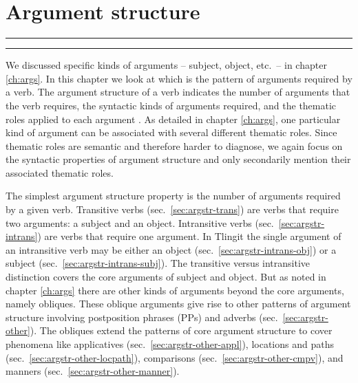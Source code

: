 
\resetexcnt
\chapter{Argument structure}\label{ch:argstr}

\startcontents[chapters]
\noindent\rule[0.5em]{\textwidth}{\heavyrulewidth}
\noindent\rule{\textwidth}{\heavyrulewidth}
\vspace{1\baselineskip}


We discussed specific kinds of arguments – subject, object, etc.\ – in chapter \ref{ch:args}.
In this chapter we look at  which is the pattern of arguments required by a verb.
The argument structure of a verb indicates the number of arguments that the verb requires, the syntactic kinds of arguments required, and the thematic roles applied to each argument \parencite{levin:2018}.
As detailed in chapter \ref{ch:args}, one particular kind of argument can be associated with several different thematic roles.
Since thematic roles are semantic and therefore harder to diagnose, we again focus on the syntactic properties of argument structure and only secondarily mention their associated thematic roles.

The simplest argument structure property is the number of arguments required by a given verb.
Transitive verbs (sec.\ \ref{sec:argstr-trans}) are verbs that require two arguments: a subject and an object.
Intransitive verbs (sec.\ \ref{sec:argstr-intrans}) are verbs that require one argument.
In Tlingit the single argument of an intransitive verb may be either an object (sec.\ \ref{sec:argstr-intrans-obj}) or a subject (sec.\ \ref{sec:argstr-intrans-subj}).
The transitive versus intransitive distinction covers the core arguments of subject and object.
But as noted in chapter \ref{ch:args} there are other kinds of arguments beyond the core arguments, namely obliques.
These oblique arguments give rise to other patterns of argument structure involving postposition phrases (PPs) and adverbs (sec.\ \ref{sec:argstr-other}).
The obliques extend the patterns of core argument structure to cover phenomena like applicatives (sec.\ \ref{sec:argstr-other-appl}), locations and paths (sec.\ \ref{sec:argstr-other-locpath}), comparisons (sec.\ \ref{sec:argstr-other-cmpv}), and manners (sec.\ \ref{sec:argstr-other-manner}).


